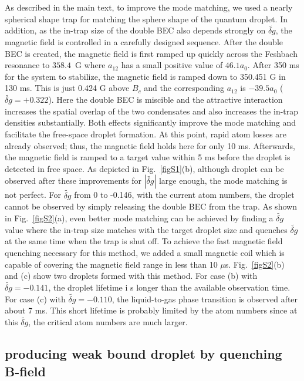 As described in the main text, to improve the mode matching, we used a nearly spherical shape trap for matching the sphere shape of the quantum droplet.
In addition, as the in-trap size of the double BEC also depends strongly on $\widetilde{\delta g}$, the magnetic field is controlled in a carefully designed sequence. After the double BEC is created, the magnetic field is first ramped up quickly across the Feshbach resonance to $358.4$~G where $a_{12}$ has a small positive value of $46.1a_0$.
After 350 ms for the system to stabilize, the magnetic field is ramped down to 350.451 G in 130 ms.
This is just 0.424 G above $B_c$ and the corresponding $a_{12}$ is $-39.5a_0$ ($\widetilde{\delta g} = +0.322$).
Here the double BEC is miscible and the attractive interaction increases the spatial overlap of the two condensates and also increases the in-trap 
densities substantially. Both effects significantly improve the mode matching and facilitate the free-space droplet formation.
At this point, rapid atom losses are already observed; thus, the magnetic 
field holds here for only 10 ms.
Afterwards, the magnetic field is ramped to a target value within 5 ms before the droplet is detected in free space.
As depicted in Fig.~\ref{figS1}(b), although droplet can be observed after these improvements for $|\widetilde{\delta g}|$ large enough, the mode matching is not perfect. For $\widetilde{\delta g}$ from 0 to -0.146, with the current atom numbers, the droplet cannot be observed by simply releasing the double BEC from the trap. As shown in Fig.~\ref{figS2}(a), even 
better mode matching can be achieved by finding a $\widetilde{\delta g}$ value where the in-trap size matches with the target droplet size and quenches $\widetilde{\delta g}$ at the same time when the trap is shut off. To achieve the fast magnetic field quenching necessary for this method, we added a small magnetic coil which is capable of covering the magnetic field range in less than 10 $\mu$s. Fig.~\ref{figS2}(b) and (c) show two droplets formed with this method. For case (b) with $\widetilde{\delta g} = -0.141$, the droplet lifetime i
s longer than the available observation time. For case (c) with $\widetilde{\delta g} = -0.110$, the liquid-to-gas phase transition is observed after about 7 ms. This short lifetime is probably limited by the atom numbers since at this $\widetilde{\delta g}$, the critical atom numbers are much larger.




\subsection{producing weak bound droplet by quenching B-field}

